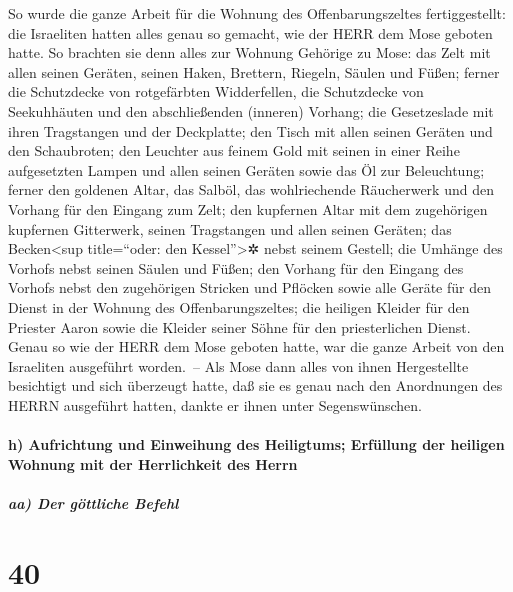  So wurde die ganze Arbeit für die Wohnung des
Offenbarungszeltes fertiggestellt: die Israeliten hatten alles genau so
gemacht, wie der HERR dem Mose geboten hatte.  So
brachten sie denn alles zur Wohnung Gehörige zu Mose: das Zelt mit allen
seinen Geräten, seinen Haken, Brettern, Riegeln, Säulen und Füßen;
 ferner die Schutzdecke von rotgefärbten Widderfellen,
die Schutzdecke von Seekuhhäuten und den abschließenden (inneren)
Vorhang;  die Gesetzeslade mit ihren Tragstangen und der
Deckplatte;  den Tisch mit allen seinen Geräten und den
Schaubroten;  den Leuchter aus feinem Gold mit seinen in
einer Reihe aufgesetzten Lampen und allen seinen Geräten sowie das Öl
zur Beleuchtung;  ferner den goldenen Altar, das Salböl,
das wohlriechende Räucherwerk und den Vorhang für den Eingang zum Zelt;
 den kupfernen Altar mit dem zugehörigen kupfernen
Gitterwerk, seinen Tragstangen und allen seinen Geräten; das
Becken\textless sup title=``oder: den Kessel''\textgreater✲ nebst seinem
Gestell;  die Umhänge des Vorhofs nebst seinen Säulen und
Füßen; den Vorhang für den Eingang des Vorhofs nebst den zugehörigen
Stricken und Pflöcken sowie alle Geräte für den Dienst in der Wohnung
des Offenbarungszeltes;  die heiligen Kleider für den
Priester Aaron sowie die Kleider seiner Söhne für den priesterlichen
Dienst.  Genau so wie der HERR dem Mose geboten hatte,
war die ganze Arbeit von den Israeliten ausgeführt worden.~--
 Als Mose dann alles von ihnen Hergestellte besichtigt
und sich überzeugt hatte, daß sie es genau nach den Anordnungen des
HERRN ausgeführt hatten, dankte er ihnen unter Segenswünschen.

\hypertarget{h-aufrichtung-und-einweihung-des-heiligtums-erfuxfcllung-der-heiligen-wohnung-mit-der-herrlichkeit-des-herrn}{%
\paragraph{h) Aufrichtung und Einweihung des Heiligtums; Erfüllung der
heiligen Wohnung mit der Herrlichkeit des
Herrn}\label{h-aufrichtung-und-einweihung-des-heiligtums-erfuxfcllung-der-heiligen-wohnung-mit-der-herrlichkeit-des-herrn}}

\hypertarget{aa-der-guxf6ttliche-befehl}{%
\subparagraph{aa) Der göttliche
Befehl}\label{aa-der-guxf6ttliche-befehl}}

\hypertarget{section-39}{%
\section{40}\label{section-39}}

